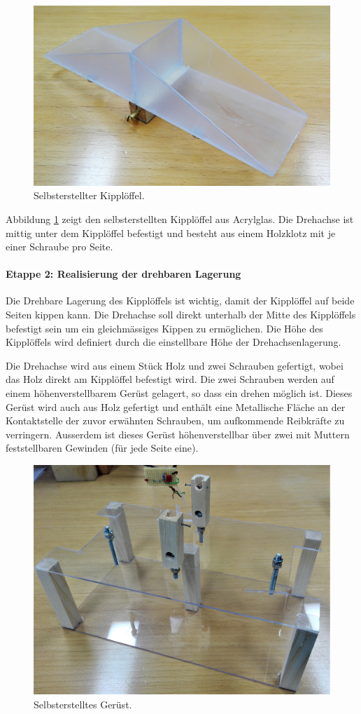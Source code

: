 \begin{figure}[h]
\centering
\includegraphics[width=0.8\linewidth]{graphics/Etappe1.jpg}
\caption{Selbsterstellter Kipplöffel.}
\label{fig:Etappe1}
\end{figure}

Abbildung \ref{fig:Etappe1} zeigt den selbsterstellten Kipplöffel aus Acrylglas. Die Drehachse ist mittig unter dem Kipplöffel befestigt und besteht aus einem Holzklotz mit je einer Schraube pro Seite.

\paragraph{Etappe 2: Realisierung der drehbaren Lagerung}
Die Drehbare Lagerung des Kipplöffels ist wichtig, damit der Kipplöffel auf beide Seiten kippen kann. Die Drehachse soll direkt unterhalb der Mitte des Kipplöffels befestigt sein um ein gleichmässiges Kippen zu ermöglichen. Die Höhe des Kipplöffels wird definiert durch die einstellbare Höhe der Drehachsenlagerung. 

Die Drehachse wird aus einem Stück Holz und zwei Schrauben gefertigt, wobei das Holz direkt am Kipplöffel befestigt wird. Die zwei Schrauben werden auf einem höhenverstellbarem Gerüst gelagert, so dass ein drehen möglich ist. Dieses Gerüst wird auch aus Holz gefertigt und enthält eine Metallische Fläche an der Kontaktstelle der zuvor erwähnten Schrauben, um aufkommende Reibkräfte zu verringern. Ausserdem ist dieses Gerüst höhenverstellbar über zwei mit Muttern feststellbaren Gewinden (für jede Seite eine). 

\begin{figure}[h]
\centering
\includegraphics[width=0.8\linewidth]{graphics/Etappe2.jpg}
\caption{Selbsterstelltes Gerüst.}
\label{fig:Etappe2}
\end{figure}

